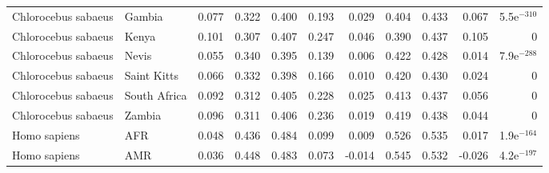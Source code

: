 \begin{longtable}{llrrrrrrrrr}
 Chlorocebus sabaeus &                    Gambia &                              0.077 &                               0.322 &                 0.400 &                 0.193 &                              0.029 &                               0.404 &                 0.433 &                 0.067 & 5.5e$^{-310}$ \\
 Chlorocebus sabaeus &                     Kenya &                              0.101 &                               0.307 &                 0.407 &                 0.247 &                              0.046 &                               0.390 &                 0.437 &                 0.105 &             0 \\
 Chlorocebus sabaeus &                     Nevis &                              0.055 &                               0.340 &                 0.395 &                 0.139 &                              0.006 &                               0.422 &                 0.428 &                 0.014 & 7.9e$^{-288}$ \\
 Chlorocebus sabaeus &               Saint Kitts &                              0.066 &                               0.332 &                 0.398 &                 0.166 &                              0.010 &                               0.420 &                 0.430 &                 0.024 &             0 \\
 Chlorocebus sabaeus &              South Africa &                              0.092 &                               0.312 &                 0.405 &                 0.228 &                              0.025 &                               0.413 &                 0.437 &                 0.056 &             0 \\
 Chlorocebus sabaeus &                    Zambia &                              0.096 &                               0.311 &                 0.406 &                 0.236 &                              0.019 &                               0.419 &                 0.438 &                 0.044 &             0 \\
        Homo sapiens &                       AFR &                              0.048 &                               0.436 &                 0.484 &                 0.099 &                              0.009 &                               0.526 &                 0.535 &                 0.017 & 1.9e$^{-164}$ \\
        Homo sapiens &                       AMR &                              0.036 &                               0.448 &                 0.483 &                 0.073 &                             -0.014 &                               0.545 &                 0.532 &                -0.026 & 4.2e$^{-197}$ \\

\end{longtable}
